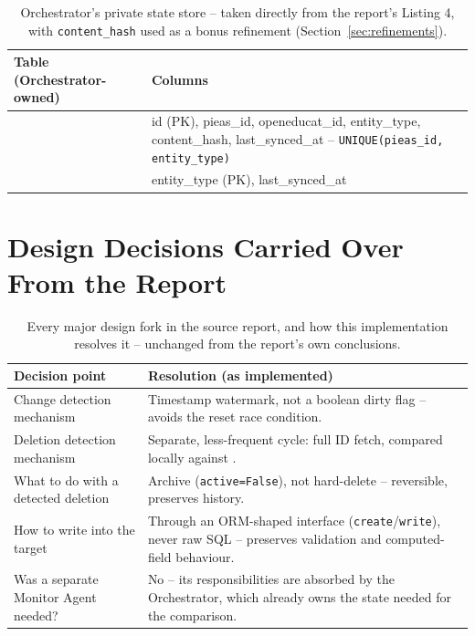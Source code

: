 \documentclass[11pt,a4paper]{article}
\newcommand{\ttu}[1]{\texttt{\detokenize{#1}}}
\begin{document}
\begin{table}[H]
\centering
\small
\begin{tabular}{@{}lp{9.6cm}@{}}
\toprule
\textbf{Table (Orchestrator-owned)} & \textbf{Columns} \\
\midrule
\ttu{sync_mapping} & id (PK), pieas\_id, openeducat\_id, entity\_type, content\_hash,
last\_synced\_at -- \texttt{UNIQUE(pieas\_id, entity\_type)} \\
\ttu{sync_state} & entity\_type (PK), last\_synced\_at \\
\bottomrule
\end{tabular}
\caption{Orchestrator's private state store -- taken directly from the report's Listing 4, with
\texttt{content\_hash} used as a bonus refinement (Section~\ref{sec:refinements}).}
\end{table}

\section{Design Decisions Carried Over From the Report}

\begin{table}[H]
\centering
\small
\begin{tabular}{@{}p{4.6cm}p{9.4cm}@{}}
\toprule
\textbf{Decision point} & \textbf{Resolution (as implemented)} \\
\midrule
Change detection mechanism & Timestamp watermark, not a boolean dirty flag -- avoids the
reset race condition. \\
Deletion detection mechanism & Separate, less-frequent cycle: full ID fetch, compared locally
against \ttu{sync_mapping}. \\
What to do with a detected deletion & Archive (\texttt{active=False}), not hard-delete --
reversible, preserves history. \\
How to write into the target & Through an ORM-shaped interface (\texttt{create}/\texttt{write}),
never raw SQL -- preserves validation and computed-field behaviour. \\
Was a separate Monitor Agent needed? & No -- its responsibilities are absorbed by the
Orchestrator, which already owns the state needed for the comparison. \\
\bottomrule
\end{tabular}
\caption{Every major design fork in the source report, and how this implementation resolves it
-- unchanged from the report's own conclusions.}
\end{table}
\end{document}
